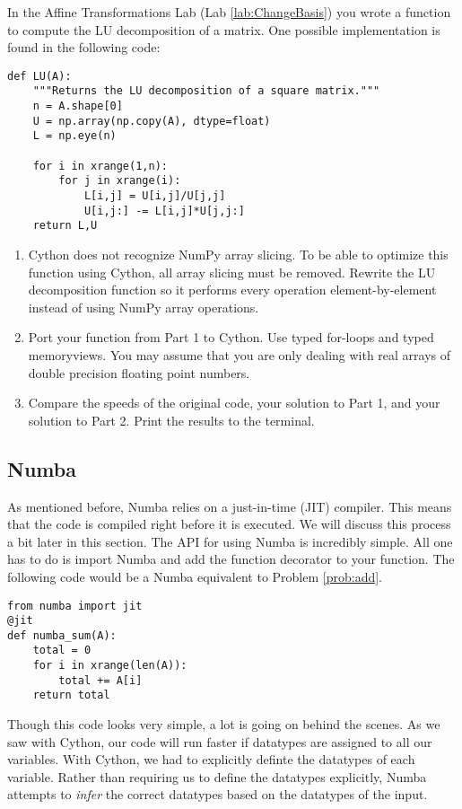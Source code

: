 \begin{problem}
In the Affine Transformations Lab (Lab \ref{lab:ChangeBasis}) you wrote a function to compute the LU decomposition of a matrix. One possible implementation is found in the following code:
\begin{lstlisting}
def LU(A):
    """Returns the LU decomposition of a square matrix."""
    n = A.shape[0]
    U = np.array(np.copy(A), dtype=float)
    L = np.eye(n)

    for i in xrange(1,n):
        for j in xrange(i):
            L[i,j] = U[i,j]/U[j,j]
            U[i,j:] -= L[i,j]*U[j,j:]
    return L,U
\end{lstlisting}
\begin{enumerate}
\item Cython does not recognize NumPy array slicing. To be able to optimize this function using Cython, all array slicing must be removed. Rewrite the LU decomposition function so it performs every operation element-by-element instead of using NumPy array operations.
\item Port your function from Part 1 to Cython.
Use typed for-loops and typed memoryviews.
You may assume that you are only dealing with real arrays of double precision floating point numbers.
\item Compare the speeds of the original code, your solution to Part 1, and your solution to Part 2. Print the results to the terminal.
\end{enumerate}
\end{problem}

\subsection*{Numba}
As mentioned before, Numba relies on a just-in-time (JIT) compiler. This means that the code is compiled right before it is executed. We will discuss this process a bit later in this section.
The API for using Numba is incredibly simple. All one has to do is import Numba and add the  function decorator to your function. The following code would be a Numba equivalent to Problem \ref{prob:add}.
\begin{lstlisting}
from numba import jit
@jit
def numba_sum(A):
    total = 0
    for i in xrange(len(A)):
        total += A[i]
    return total
\end{lstlisting}

Though this code looks very simple, a lot is going on behind the scenes. As we saw with Cython, our code will run faster if datatypes are assigned to all our variables. With Cython, we had to explicitly definte the datatypes of each variable. Rather than requiring us to define the datatypes explicitly, Numba attempts to \emph{infer} the correct datatypes based on the datatypes of the input.

